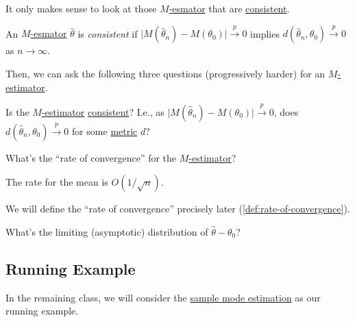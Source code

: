 It only makes sense to look at those \hyperref[prb:M-estimation]{\(M\)-esmator} that are \hyperref[def:consistent]{consistent}.

\begin{definition}[Consistent]\label{def:consistent}
	An \hyperref[prb:M-estimation]{\(M\)-esmator} \(\hat{\theta} \) is \emph{consistent} if \(\vert M(\hat{\theta} _n) - M(\theta _0) \vert \overset{p}{\to } 0\) implies \(d(\hat{\theta} _n, \theta _0) \overset{p}{\to } 0\) as \(n\to \infty \).
\end{definition}

Then, we can ask the following three questions (progressively harder) for an \hyperref[prb:M-estimation]{\(M\)-estimator}.

\begin{problem}[Consistency]\label{prb:consistency}
Is the \hyperref[prb:M-estimation]{\(M\)-estimator} \hyperref[def:consistent]{consistent}? I.e., as \(\vert M(\hat{\theta} _n) - M(\theta _0) \vert \overset{p}{\to } 0\), does \(d(\hat{\theta} _n, \theta _0) \overset{p}{\to } 0\) for some \hyperref[def:pseudo-metric]{metric} \(d\)?
\end{problem}

\begin{problem}\label{prb:rate-of-convergence}
What's the ``rate of convergence'' for the \hyperref[prb:M-estimation]{\(M\)-estimator}?
\end{problem}

\begin{eg}
	The rate for the mean is \(O(1 / \sqrt{n} )\).
\end{eg}

We will define the ``rate of convergence'' precisely later (\autoref{def:rate-of-convergence}).

\begin{problem}\label{prb:limiting-distribution}
What's the limiting (asymptotic) distribution of \(\hat{\theta} - \theta _0\)?
\end{problem}

\subsection{Running Example}
In the remaining class, we will consider the \hyperref[eg:mode-estimation]{sample mode estimation} as our running example.

